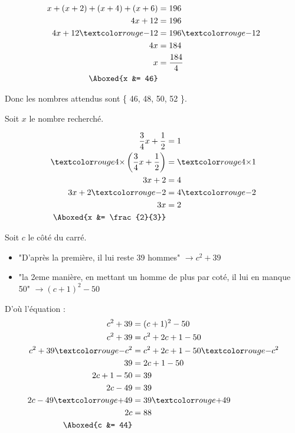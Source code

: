 \documentclass["../Cours.tex"]{subfiles}
\begin{document}
\begin{questions}
    \begin{align*}
        x + (x+2) + (x+4) + (x+6) &= 196 \\ 
        4x + 12 &= 196 \\
        4x + 12 \red{-12} &= 196 \red{-12} \\
        4x &= 184 \\
        x &= \frac{184}{4}\\ 
        \Aboxed{x &= 46}
    \end{align*}

    Donc les nombres attendus sont \{ 46, 48, 50, 52 \}.

    \exercice Soit $x$ le nombre recherché.

    \begin{align*}
        \frac{3}{4}x + \frac{1}{2} &= 1 \\ 
        \red{4 \times} \left( \frac{3}{4}x + \frac{1}{2} \right) &= \red{4 \times} 1 \\ 
        3x + 2 &= 4 \\ 
        3x + 2 \red{-2} &= 4 \red{-2} \\ 
        3x &= 2 \\ 
        \Aboxed{x &= \frac{2}{3}}
    \end{align*}

    \exercice Soit $c$ le côté du carré.
    \begin{itemize}
        \item "D’après la première, il lui reste 39 hommes" $\longrightarrow c^2 + 39$
        \item "la 2eme manière, en mettant un homme de plus par coté, il lui en manque 50" $\longrightarrow (c+1)^2 - 50$
    \end{itemize}

    D'où l'équation : 
    \begin{align*}
        c^2 + 39 &= (c+1)^2 - 50 \\ 
        c^2 + 39 &= c^2 + 2c + 1 - 50 \\
        c^2 + 39 \red{- c^2} &= c^2 + 2c + 1 - 50  \red{- c^2} \\ 
        39 &= 2c + 1 - 50 \\ 
        2c + 1 - 50 &= 39 \\ 
        2c - 49 &= 39 \\ 
        2c - 49  \red{+49} &= 39  \red{+49} \\ 
        2c &= 88 \\ 
        \Aboxed{c &= 44}
    \end{align*}
    

\end{questions}
\end{document}
